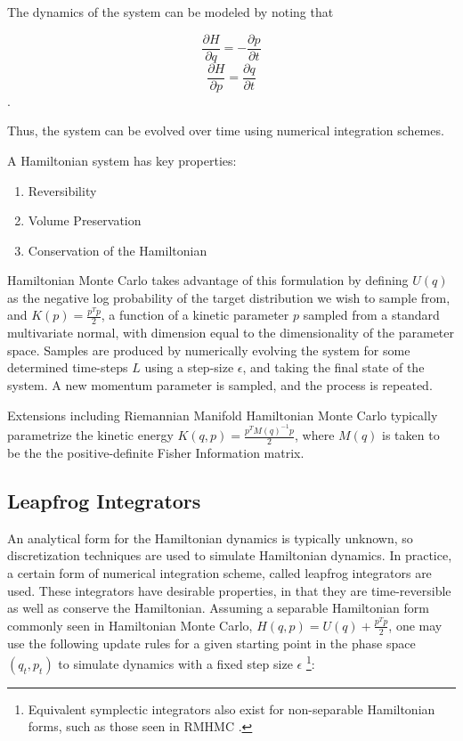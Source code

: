 \documentclass{article}
\theoremstyle{plain}
\theoremstyle{definition}
\theoremstyle{remark}
\begin{document}
The dynamics of the system can be modeled 
by noting that 

$$ \frac{\partial H}{\partial q} = -\frac{\partial p}{\partial t}$$
$$ \frac{\partial H}{\partial p} = \frac{\partial q}{\partial t}$$.

Thus, the system can be evolved over time using numerical integration schemes. 

A Hamiltonian system has key properties:

\begin{enumerate}
    \item Reversibility
    \item Volume Preservation
    \item Conservation of the Hamiltonian
\end{enumerate}

Hamiltonian Monte Carlo \cite{Brooks_2011} takes advantage of this formulation by defining $U(q)$ as the negative log probability of the target distribution we wish to sample from, and $K(p) = \frac{p^Tp}{2}$, a function of a kinetic parameter $p$ sampled from a standard multivariate normal, with dimension equal to the dimensionality of the parameter space. Samples are produced by numerically evolving the system for some determined time-steps $L$ using a step-size $\epsilon$, and taking the final state of the system. A new momentum parameter is sampled, and the process is repeated. 

Extensions including Riemannian Manifold Hamiltonian  Monte Carlo \cite{Betancourt_2013} typically parametrize the kinetic energy $K(q,p) = \frac{p^TM(q)^{-1}p}{2}$, where $M(q)$ is taken to be the the positive-definite Fisher Information matrix. 
 

\subsection{Leapfrog Integrators}

An analytical form for the Hamiltonian dynamics is typically unknown, so discretization techniques are used to simulate Hamiltonian dynamics. In practice, a certain form of numerical integration scheme, called leapfrog integrators are used. These integrators have desirable properties, in that they are time-reversible as well as conserve the Hamiltonian. Assuming a separable Hamiltonian form commonly seen in Hamiltonian Monte Carlo, $H(q,p) = U(q) + \frac{p^Tp}{2}$, one may use the following update rules for a given starting point in the phase space $(q_t, p_t)$ to simulate dynamics with a fixed step size $\epsilon$ \footnote[2]{Equivalent symplectic integrators also exist for non-separable Hamiltonian forms, such as those seen in RMHMC \cite{Tao_2016}.}:
\end{document}
